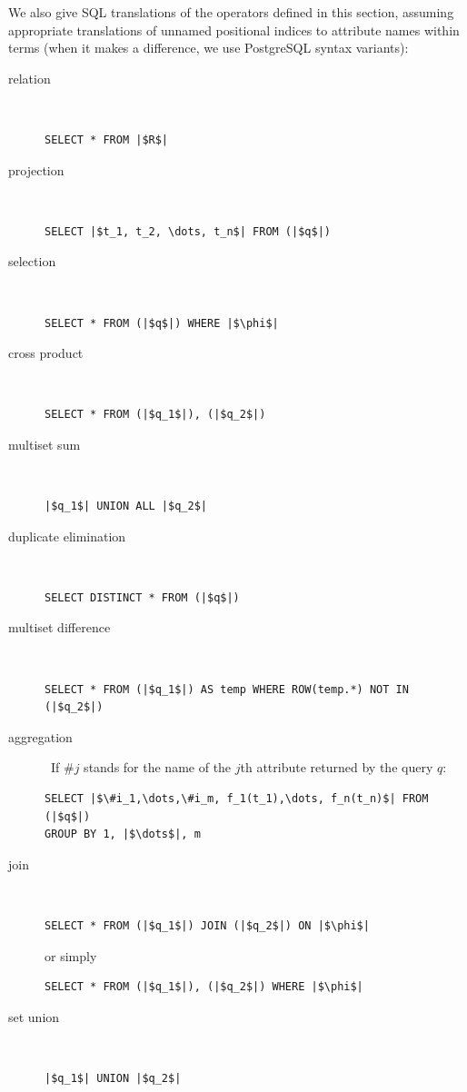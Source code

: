 \begin{toappendix}
	We also give SQL translations
	of the operators defined in this section, assuming appropriate
	translations of unnamed positional indices to attribute names within
	terms (when it makes a difference, we use
	PostgreSQL syntax variants):
	\begin{description}
		\item[relation]~
		\begin{verbatim}
SELECT * FROM |$R$|
    \end{verbatim}
		\item[projection]~
		\begin{verbatim}
SELECT |$t_1, t_2, \dots, t_n$| FROM (|$q$|)
    \end{verbatim}
		\item[selection]~
		\begin{verbatim}
SELECT * FROM (|$q$|) WHERE |$\phi$|
    \end{verbatim}
		\item[cross product]~
		\begin{verbatim}
SELECT * FROM (|$q_1$|), (|$q_2$|)
    \end{verbatim}
		\item[multiset sum]~
		\begin{verbatim}
|$q_1$| UNION ALL |$q_2$|
    \end{verbatim}
		\item[duplicate elimination]~
		\begin{verbatim}
SELECT DISTINCT * FROM (|$q$|)
    \end{verbatim}
		\item[multiset difference]~
		\begin{verbatim}
SELECT * FROM (|$q_1$|) AS temp WHERE ROW(temp.*) NOT IN (|$q_2$|)
    \end{verbatim}
		\item[aggregation]~If $\#j$ stands for the name of the $j$th attribute
		returned by the query $q$:
		\begin{verbatim}
SELECT |$\#i_1,\dots,\#i_m, f_1(t_1),\dots, f_n(t_n)$| FROM (|$q$|)
GROUP BY 1, |$\dots$|, m
    \end{verbatim}
		\item[join]~
		\begin{verbatim}
SELECT * FROM (|$q_1$|) JOIN (|$q_2$|) ON |$\phi$|
    \end{verbatim}
		or simply
		\begin{verbatim}
SELECT * FROM (|$q_1$|), (|$q_2$|) WHERE |$\phi$|
    \end{verbatim}
		\item[set union]~
		\begin{verbatim}
|$q_1$| UNION |$q_2$|
    \end{verbatim}
	\end{description}


\end{toappendix}
